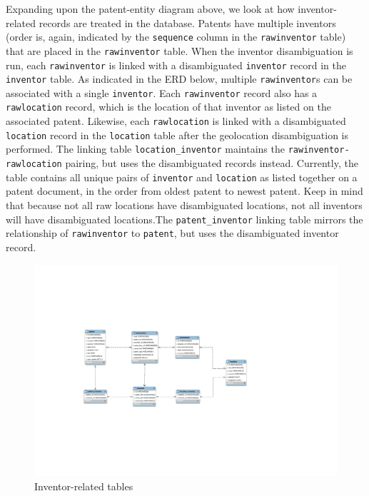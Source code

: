 Expanding upon the patent-entity diagram above, we look at how inventor-related records are treated in the database. Patents have multiple inventors (order is, again, indicated by the \verb`sequence` column in the \verb`rawinventor` table) that are placed in the \verb`rawinventor` table. When the inventor disambiguation is run, each \verb`rawinventor` is linked with a disambiguated \verb`inventor` record in the \verb`inventor` table. As indicated in the ERD below, multiple \verb`rawinventor`s can be associated with a single \verb`inventor`. Each \verb`rawinventor` record also has a \verb`rawlocation` record, which is the location of that inventor as listed on the associated patent. Likewise, each \verb`rawlocation` is linked with a disambiguated \verb`location` record in the \verb`location` table after the geolocation disambiguation is performed. The linking table \verb`location_inventor` maintains the \verb`rawinventor-rawlocation` pairing, but uses the disambiguated records instead. Currently, the table contains all unique pairs of \verb`inventor` and \verb`location` as listed together on a patent document, in the order from oldest patent to newest patent. Keep in mind that because not all raw locations have disambiguated locations, not all inventors will have disambiguated locations.The \verb`patent_inventor` linking table mirrors the relationship of \verb`rawinventor` to \verb`patent`, but uses the disambiguated inventor record.

\begin{figure}[!htbp]
\includegraphics[width=\linewidth]{figs/Inventor}
\caption{Inventor-related tables}
\end{figure}

